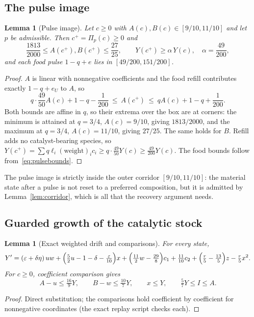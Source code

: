 \documentclass[11pt,a4paper]{article}
\theoremstyle{plain}
\newtheorem{lemma}[theorem]{Lemma}
\theoremstyle{definition}
\theoremstyle{remark}
\newcommand{\eps}{\varepsilon}
\newcommand{\Pulse}{\Pi}
\newcommand{\Iv}{I}
\begin{document}
\subsection{The pulse image}
\begin{lemma}[Pulse image]\label{lem:pulse}
Let $c\ge0$ with $A(c),B(c)\in[9/10,11/10]$ and let $p$ be admissible. Then $c^+=\Pulse_p(c)\ge0$ and
\begin{equation}\label{eq:pulseimage}
\frac{1813}{2000}\le A(c^+),B(c^+)\le\frac{27}{25},\qquad
Y(c^+)\ge\alpha\,Y(c),\quad \alpha=\frac{49}{200},
\end{equation}
and each food pulse $1-q+e$ lies in $[49/200,151/200]$.
\end{lemma}
\begin{proof}
$A$ is linear with nonnegative coefficients and the food refill contributes exactly $1-q+e_U$ to $A$, so
\[
q\cdot\frac{49}{50}A(c)+1-q-\frac1{200}\ \le\ A(c^+)\ \le\ qA(c)+1-q+\frac1{200}.
\]
Both bounds are affine in $q$, so their extrema over the box are at corners: the minimum is attained at $q=3/4$, $A(c)=9/10$, giving $1813/2000$, and the maximum at $q=3/4$, $A(c)=11/10$, giving $27/25$. The same holds for $B$. Refill adds no catalyst-bearing species, so $Y(c^+)=\sum q\ell_i(\text{weight})_ic_i\ge q\cdot\tfrac{49}{50}Y(c)\ge\tfrac{49}{200}Y(c)$. The food bounds follow from~\eqref{eq:pulsebounds}.
\end{proof}
The pulse image is strictly inside the outer corridor $[9/10,11/10]$: the material state after a pulse is not reset to a preferred composition, but it is admitted by Lemma~\ref{lem:corridor}, which is all that the recovery argument needs.

\subsection{Guarded growth of the catalytic stock}
\begin{lemma}[Exact weighted drift and comparisons]\label{lem:drift}
For every state,
\begin{equation}\label{eq:drift}
Y'=(\eps+\delta\eta)\,uw+\Bigl(\tfrac52u-1-\delta-\tfrac\eps{10}\Bigr)x+\Bigl(\tfrac{11}{2}w-\tfrac{29}{8}\Bigr)c_1+\tfrac{11}{10}c_2+\Bigl(\tfrac r5-\tfrac{13}{5}\Bigr)z-\tfrac r5x^2 .
\end{equation}
For $c\ge0$, coefficient comparison gives
\begin{equation}\label{eq:comparisons}
A-u\le\tfrac{16}{9}Y,\qquad B-w\le\tfrac{10}{7}Y,\qquad x\le Y,\qquad \tfrac57Y\le\Iv\le A .
\end{equation}
\end{lemma}
\begin{proof}
Direct substitution; the comparisons hold coefficient by coefficient for nonnegative coordinates (the exact replay script checks each).
\end{proof}
\end{document}
